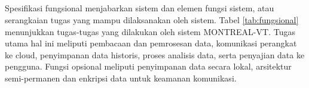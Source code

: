 \documentclass{elsinta}
\begin{document}
\subsection{\FunctionalSpecTitle}
Spesifikasi fungsional menjabarkan sistem dan elemen fungsi sistem, atau serangkaian tugas
yang mampu dilaksanakan oleh sistem\cite{BritishStandardsInstitution2016}. Tabel \ref{tab:fungsional} menunjukkan
tugas-tugas yang dilakukan oleh sistem MONTREAL-VT. Tugas utama hal ini meliputi pembacaan
dan pemrosesan data, komunikasi perangkat ke cloud, penyimpanan data historis, 
proses analisis data, serta penyajian data ke pengguna. Fungsi opsional meliputi penyimpanan
data secara lokal, arsitektur semi-permanen dan enkripsi data untuk keamanan komunikasi.

\end{document}
